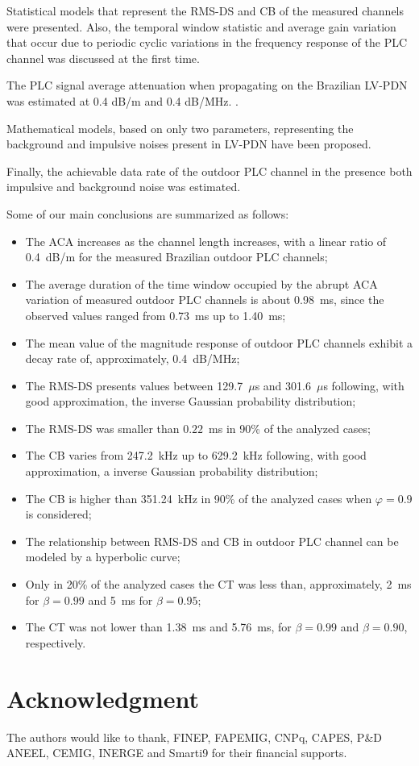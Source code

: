 \documentclass[journal]{IEEEtran}
\begin{document}
Statistical models that represent the RMS-DS and CB of the measured channels were presented. Also, the temporal window statistic and average gain variation that occur due to periodic cyclic variations in the frequency response of the \ac{PLC} channel was discussed at the first time.

The PLC signal average attenuation when propagating on the Brazilian \ac{LV-PDN} was estimated at 0.4 dB/m and 0.4 dB/MHz. .

Mathematical models, based on only two parameters, representing the background and impulsive noises present in \ac{LV-PDN} have been proposed.

Finally, the achievable data rate of the outdoor PLC channel in the presence both impulsive and background noise was estimated.

Some of our main conclusions are summarized as follows:
\begin{itemize}
	\item The \ac{ACA} increases as the channel length increases, with a linear ratio of 0.4~dB/m for the measured Brazilian outdoor PLC channels;
	\item The average duration of the time window occupied by the abrupt \ac{ACA} variation of measured outdoor PLC channels is about 0.98~ms, since the observed values ranged from 0.73~ms up to 1.40~ms;
	\item The mean value of the magnitude response of outdoor PLC channels exhibit a decay rate of, approximately, 0.4~dB/MHz; 
	\item The \ac{RMS-DS} presents values between 129.7~$\mu$s and 301.6~$\mu$s following, with good approximation, the inverse Gaussian probability distribution; 
	\item The \ac{RMS-DS} was smaller than $0.22$~ms in 90\% of the analyzed cases;
	\item The \ac{CB} varies from 247.2~kHz up to 629.2~kHz following, with good approximation, a inverse Gaussian probability distribution;
	\item The \ac{CB} is higher than 351.24~kHz in 90\% of the analyzed cases when  $\varphi = 0.9$ is considered;
	\item The relationship between \ac{RMS-DS} and \ac{CB} in outdoor \ac{PLC} channel can be modeled by a hyperbolic curve;
	\item Only in 20\% of the analyzed cases the \ac{CT} was less than, approximately, 2~ms for $\beta = 0.99$ and 5~ms for $\beta = 0.95$; 
	\item The \ac{CT} was not lower than 1.38~ms and 5.76~ms, for $\beta=0.99$ and $\beta = 0.90$, respectively.
\end{itemize}

\section*{Acknowledgment}

The authors would like to thank, FINEP, FAPEMIG, CNPq, CAPES, P\&D
ANEEL, CEMIG, INERGE and Smarti9 for their financial supports.



\end{document}
